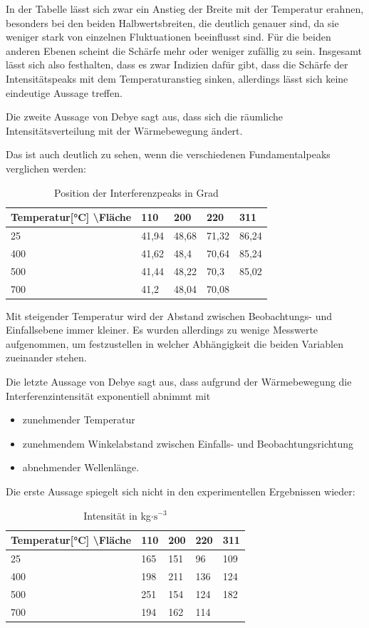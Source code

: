 \documentclass[
	a4paper,
	12pt,
	pagesize,
	ngerman
]{scrartcl}
\begin{document}
In der Tabelle lässt sich zwar ein Anstieg der Breite mit der Temperatur erahnen, besonders bei den beiden Halbwertsbreiten, die deutlich genauer sind, da sie weniger stark von einzelnen Fluktuationen beeinflusst sind. Für die beiden anderen Ebenen scheint die Schärfe mehr oder weniger zufällig zu sein. Insgesamt lässt sich also festhalten, dass es zwar Indizien dafür gibt, dass die Schärfe der Intensitätspeaks mit dem Temperaturanstieg sinken, allerdings lässt sich keine eindeutige Aussage treffen. 

Die zweite Aussage von Debye sagt aus, dass sich die räumliche Intensitätsverteilung mit der Wärmebewegung ändert.

Das ist auch deutlich zu sehen, wenn die verschiedenen Fundamentalpeaks verglichen werden:
\begin{table}[h]
\caption{Position der Interferenzpeaks in Grad}
\begin{tabular}{l|llll}
Temperatur[°C] \textbackslash{}Fläche & 110   & 200   & 220   & 311   \\ \hline
25                               & 41,94 & 48,68 & 71,32 & 86,24 \\
400                              & 41,62 & 48,4  & 70,64 & 85,24 \\
500                              & 41,44 & 48,22 & 70,3  & 85,02 \\
700                              & 41,2  & 48,04 & 70,08 &      
\end{tabular}
\end{table}

Mit steigender Temperatur wird der Abstand zwischen Beobachtungs- und Einfallsebene immer kleiner. Es wurden allerdings zu wenige Messwerte aufgenommen, um festzustellen in welcher Abhängigkeit die beiden Variablen zueinander stehen.

Die letzte Aussage von Debye sagt aus, dass aufgrund der Wärmebewegung die Interferenzintensität exponentiell abnimmt mit
\begin{itemize}
\item zunehmender Temperatur 
\item zunehmendem Winkelabstand zwischen Einfalls- und Beobachtungsrichtung 
\item abnehmender Wellenlänge.
\end{itemize}

Die erste Aussage spiegelt sich nicht in den experimentellen Ergebnissen wieder:
\begin{table}[h]
\caption{Intensität in kg$\cdot \text{s}^{-3}$}
\begin{tabular}{l|llll}
Temperatur[°C] \textbackslash{}Fläche & 110 & 200 & 220 & 311 \\ \hline
25                               & 165 & 151 & 96  & 109 \\
400                              & 198 & 211 & 136 & 124 \\
500                              & 251 & 154 & 124 & 182 \\
700                              & 194 & 162 & 114 &    
\end{tabular}
\end{table}
\end{document}
